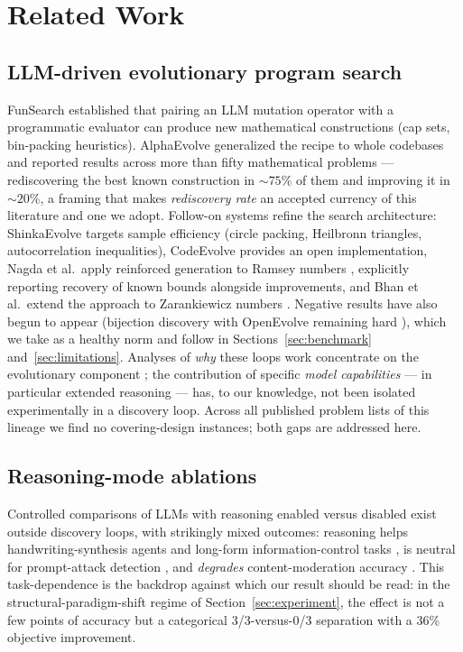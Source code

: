 \section{Related Work}\label{sec:related}

\subsection{LLM-driven evolutionary program search}

FunSearch \cite{romera2024funsearch} established that pairing an LLM
mutation operator with a programmatic evaluator can produce new
mathematical constructions (cap sets, bin-packing heuristics).
AlphaEvolve \cite{novikov2025alphaevolve} generalized the recipe to
whole codebases and reported results across more than fifty
mathematical problems --- rediscovering the best known construction
in ${\sim}75\%$ of them and improving it in ${\sim}20\%$, a framing
that makes \emph{rediscovery rate} an accepted currency of this
literature and one we adopt. Follow-on systems refine the search
architecture: ShinkaEvolve \cite{shinka2025} targets sample
efficiency (circle packing, Heilbronn triangles, autocorrelation
inequalities), CodeEvolve \cite{codeevolve2025} provides an open
implementation, Nagda et al.\ apply reinforced generation to Ramsey numbers
\cite{nagda2026ramsey}, explicitly reporting recovery of known bounds
alongside improvements, and Bhan et al.\ extend the approach to
Zarankiewicz numbers \cite{zarankiewicz2026llm}.
Negative results have also begun to appear (bijection discovery with
OpenEvolve remaining hard \cite{bijection2025openevolve}), which we
take as a healthy norm and follow in Sections~\ref{sec:benchmark}
and~\ref{sec:limitations}. Analyses of \emph{why} these loops work
concentrate on the evolutionary component \cite{zhang2024understanding};
the contribution of specific \emph{model capabilities} --- in
particular extended reasoning --- has, to our knowledge, not been
isolated experimentally in a discovery loop. Across all published
problem lists of this lineage we find no covering-design instances;
both gaps are addressed here.

\subsection{Reasoning-mode ablations}

Controlled comparisons of LLMs with reasoning enabled versus disabled
exist outside discovery loops, with strikingly mixed outcomes:
reasoning helps handwriting-synthesis agents \cite{handwriting2026}
and long-form information-control tasks \cite{pic2025}, is neutral
for prompt-attack detection \cite{promptattack2026}, and
\emph{degrades} content-moderation accuracy \cite{moderation2026}.
This task-dependence is the backdrop against which our result should
be read: in the structural-paradigm-shift regime of
Section~\ref{sec:experiment}, the effect is not a few points of
accuracy but a categorical 3/3-versus-0/3 separation with a 36\%
objective improvement.

